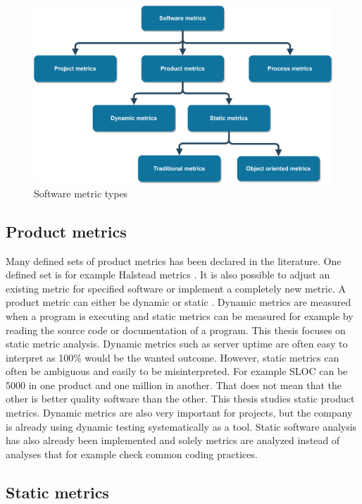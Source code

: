 \begin{figure}[t!]
\centering
\includegraphics[scale=0.05]{metrictree.png}
\caption{Software metric types}
\label{fig:metrictree}
\end{figure}

\subsection{Product metrics}

Many defined sets of product metrics has been declared in the literature. One defined set is for example Halstead metrics \cite{al2005analysis}. It is also possible to adjust an existing metric for specified software or implement a completely new metric. A product metric can either be dynamic or static \cite{sommerville2011software}. Dynamic metrics are measured when a program is executing and static metrics can be measured for example by reading the source code or documentation of a program. This thesis focuses on static metric analysis. Dynamic metrics such as server uptime are often easy to interpret as 100\% would be the wanted outcome. However, static metrics can often be ambiguous and easily to be misinterpreted. For example SLOC can be 5000 in one product and one million in another. That does not mean that the other is better quality software than the other. This thesis studies static product metrics. Dynamic metrics are also very important for projects, but the company is already using dynamic testing systematically as a tool. Static software analysis has also already been implemented and solely metrics are analyzed instead of analyses that for example check common coding practices.

\subsection{Static metrics}

